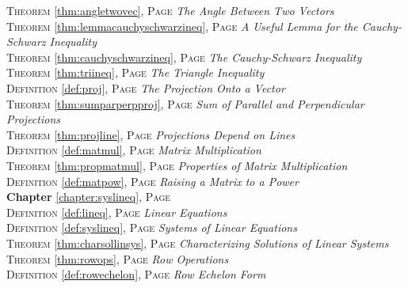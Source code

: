 \begin{multicols}{2}
{         \textsc{Theorem} \ref{thm:angletwovec}, \textsc{Page} \pageref{thm:angletwovec} \textit{The Angle Between Two Vectors} \\
         \textsc{Theorem} \ref{thm:lemmacauchyschwarzineq}, \textsc{Page} \pageref{thm:lemmacauchyschwarzineq} \textit{A Useful Lemma for the Cauchy-Schwarz Inequality} \\
         \textsc{Theorem} \ref{thm:cauchyschwarzineq}, \textsc{Page} \pageref{thm:cauchyschwarzineq} \textit{The Cauchy-Schwarz Inequality} \\
         \textsc{Theorem} \ref{thm:triineq}, \textsc{Page} \pageref{thm:triineq} \textit{The Triangle Inequality} \\
         \textsc{Definition} \ref{def:proj}, \textsc{Page} \pageref{def:proj} \textit{The Projection Onto a Vector} \\
         \textsc{Theorem} \ref{thm:sumparperpproj}, \textsc{Page} \pageref{thm:sumparperpproj} \textit{Sum of Parallel and Perpendicular Projections} \\
         \textsc{Theorem} \ref{thm:projline}, \textsc{Page} \pageref{thm:projline} \textit{Projections Depend on Lines} \\
         \textsc{Definition} \ref{def:matmul}, \textsc{Page} \pageref{def:matmul} \textit{Matrix Multiplication} \\
         \textsc{Theorem} \ref{thm:propmatmul}, \textsc{Page} \pageref{thm:propmatmul} \textit{Properties of Matrix Multiplication} \\
         \textsc{Definition} \ref{def:matpow}, \textsc{Page} \pageref{def:matpow} \textit{Raising a Matrix to a Power} \\
         \textbf{Chapter} \ref{chapter:syslineq}, \textsc{Page} \pageref{chapter:syslineq} \\
         \textsc{Definition} \ref{def:lineq}, \textsc{Page} \pageref{def:lineq} \textit{Linear Equations} \\
         \textsc{Definition} \ref{def:syslineq}, \textsc{Page} \pageref{def:syslineq} \textit{Systems of Linear Equations} \\
         \textsc{Theorem} \ref{thm:charsollinsys}, \textsc{Page} \pageref{thm:charsollinsys} \textit{Characterizing Solutions of Linear Systems} \\
         \textsc{Theorem} \ref{thm:rowops}, \textsc{Page} \pageref{thm:rowops} \textit{Row Operations} \\
         \textsc{Definition} \ref{def:rowechelon}, \textsc{Page} \pageref{def:rowechelon} \textit{Row Echelon Form} \\
}
\end{multicols}
